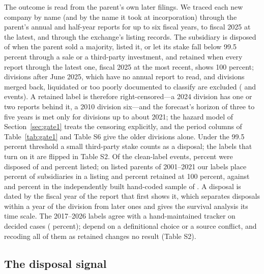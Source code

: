 The outcome is read from the parent's own later filings. We traced each new company by name (and by the name it took at incorporation) through the parent's annual and half-year reports for up to six fiscal years, to fiscal 2025 at the latest, and through the exchange's listing records. The subsidiary is disposed of when the parent sold a majority, listed it, or let its stake fall below 99.5 percent through a sale or a third-party investment, and retained when every report through the latest one, fiscal 2025 at the most recent, shows 100 percent; divisions after June 2025, which have no annual report to read, and divisions merged back, liquidated or too poorly documented to classify are excluded (\NAllOther{} and \NAllUnresolved{} events). A retained label is therefore right-censored---a 2024 division has one or two reports behind it, a 2010 division six---and the forecast's horizon of three to five years is met only for divisions up to about 2021; the hazard model of Section~\ref{sec:gate1} treats the censoring explicitly, and the period columns of Table~\ref{tab:gate1} and Table S6 give the older divisions alone. Under the 99.5 percent threshold a small third-party stake counts as a disposal; the labels that turn on it are flipped in Table S2. Of the \NClean{} clean-label events, \CleanDisposedShare{} percent were disposed of and \IPOShare{} percent listed; on listed parents of 2001--2021 our labels place \OurListedShare{} percent of subsidiaries in a listing and \OurRetainedShare{} percent retained at 100 percent, against \KLListed{} and \KLRetained{} percent in the independently built hand-coded sample of . A disposal is dated by the fiscal year of the report that first shows it, which separates disposals within a year of the division from later ones and gives the survival analysis its time scale. The 2017--2026 labels agree with a hand-maintained tracker on \LabelCrossAgree{} decided cases (\LabelCrossPct{} percent); \NSensitive{} depend on a definitional choice or a source conflict, and recoding all of them as retained changes no result (Table S2).

\subsection{The disposal signal}\label{sec:signal}

